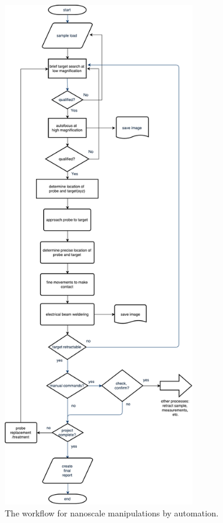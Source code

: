 \begin{figure}  
\centering
\includegraphics[width=235pt]{figures/figure7_ai}
\caption[AI for Nanomanipulation]
{The workflow for nanoscale manipulations by automation.
\label{fig:7_aiworkflow}}
\end{figure}

